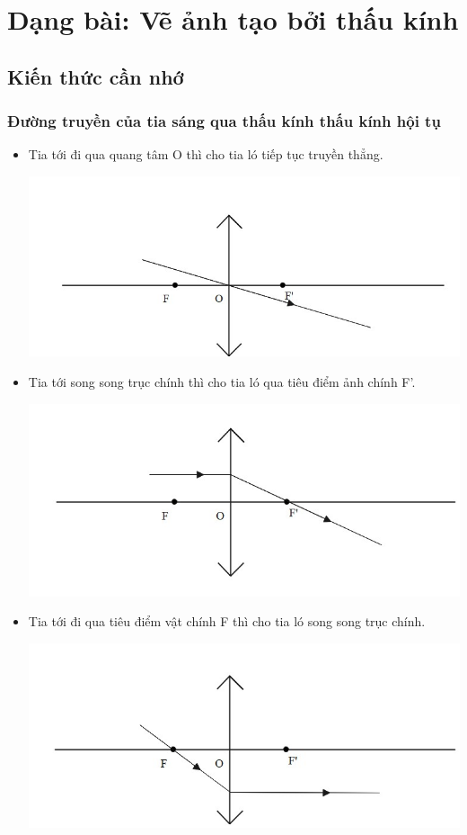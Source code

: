 
\chapter{Dạng bài: Vẽ ảnh tạo bởi thấu kính }

	
\section{Kiến thức cần nhớ}
\subsection{ Đường truyền của tia sáng qua thấu kính thấu kính hội tụ}
\begin{itemize}
	\item Tia tới đi qua quang tâm O thì cho tia ló tiếp tục truyền thẳng.
	\begin{center}
		\includegraphics[scale=0.7]{../figs/VN11-PH-38-A-004-1-h19.jpg}
	\end{center}
	\item Tia tới song song trục chính thì cho tia ló qua tiêu điểm ảnh chính F'.
	\begin{center}
		\includegraphics[scale=0.7]{../figs/VN11-PH-38-A-004-1-h20.jpg}
	\end{center}
	\item Tia tới đi qua tiêu điểm vật chính F thì cho tia ló song song trục chính. 
	\begin{center}
		\includegraphics[scale=0.7]{../figs/VN11-PH-38-A-004-1-h21.jpg}
	\end{center}
\end{itemize}
